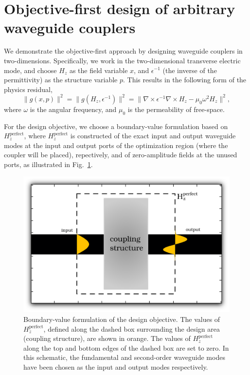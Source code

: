 \documentclass[letterpaper,10pt]{article}
\begin{document}
\section{Objective-first design of arbitrary waveguide couplers}
We demonstrate the objective-first approach
    by designing waveguide couplers in two-dimensions.
Specifically, we work in the two-dimensional transverse electric mode,
    and choose $H_z$ as the field variable $x$,
    and $\epsilon^{-1}$ (the inverse of the permittivity) 
    as the structure variable $p$.
This results in the following form of the physics residual,
    \begin{equation}
    \|g(x,p)\|^2 = 
    \|g(H_z, \epsilon^{-1})\|^2 = 
    \| \nabla \times \epsilon^{-1} \nabla \times H_z - \mu_0 \omega^2 H_z \|^2,
    \end{equation}
    where $\omega$ is the angular frequency,
    and $\mu_0$ is the permeability of free-space.

For the design objective, we choose a boundary-value formulation
    based on $H_z^\text{perfect}$,
    where $H_z^\text{perfect}$ is constructed 
    of the exact input and output waveguide modes at the input and output ports
    of the optimization region (where the coupler will be placed),
    repectively, and of zero-amplitude fields at the unused ports, 
    as illustrated in Fig.~\ref{fig:intro}.

\begin{figure}[htbp]
    \centering
    \includegraphics[width=\textwidth]{intro} 
    \caption{Boundary-value formulation of the design objective.
        The values of $H_z^\text{perfect}$, 
            defined along the dashed box surrounding the design area
            (coupling structure), 
            are shown in orange. 
        The values of $H_z^\text{perfect}$ along the top and bottom edges
            of the dashed box are set to zero.
        In this schematic, the fundamental and second-order waveguide modes
            have been chosen as the input and output modes respectively.}
    \label{fig:intro}
\end{figure}
\end{document}
